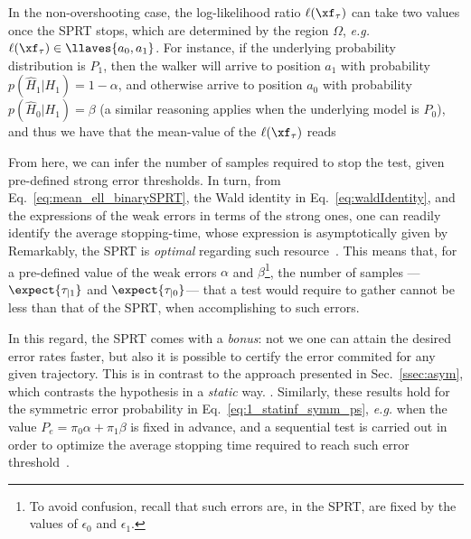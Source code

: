  In the non-overshooting case, the log-likelihood ratio $\ell(\xf_\tau)$ can take two values once the SPRT stops, which are determined by the region $\Omega$, \textit{e.g.} $\ell(\xf_\tau)\in\llaves{a_0,a_1}$. For instance, if the underlying probability distribution is $P_1$, then the walker will arrive to position $a_1$ with probability $p(\hat{H}_1|H_1) = 1-\alpha$, and otherwise arrive to position $a_0$ with probability $p(\hat{H}_0|H_1) = \beta$ (a similar reasoning applies when the underlying model is $P_0$), and thus we have that the mean-value of the $\ell(\xf_\tau)$ reads

From here, we can infer the number of samples required to stop the test, given pre-defined strong error thresholds. In turn, from Eq.~\ref{eq:mean_ell_binarySPRT}, the Wald identity in Eq.~\ref{eq:waldIdentity}, and the expressions of the weak errors in terms of the strong ones, one can readily identify the average stopping-time, whose expression is asymptotically given by
Remarkably, the SPRT is \textit{optimal} regarding such resource~\cite{Wald1948Optimum}. This means that, for a pre-defined value of the weak errors $\alpha$ and $\beta$\footnote{To avoid confusion, recall that such errors are, in the SPRT, are fixed by the values of $\epsilon_0$ and $\epsilon_1$.}, the number of samples ---$\expect{\tau_{|1}}$ and $\expect{\tau_{|0}}$--- that a test would require to gather cannot be less than that of the SPRT, when accomplishing to such errors.

In this regard, the SPRT comes with a \textit{bonus}: not we one can attain the desired error rates faster, but also it is possible to certify the error commited for any given trajectory. This is in contrast to the approach presented in Sec.~\ref{ssec:asym}, which contrasts the hypothesis in a \textit{static} way. . Similarly, these results hold for the symmetric error probability in Eq.~\ref{eq:1_statinf_symm_ps}, \textit{e.g.} when the value $P_e = \pi_0 \alpha + \pi_1 \beta$ is fixed in advance, and a sequential test is carried out in order to optimize the average stopping time required to reach such error threshold~\cite{Gordon1976Improved}.

